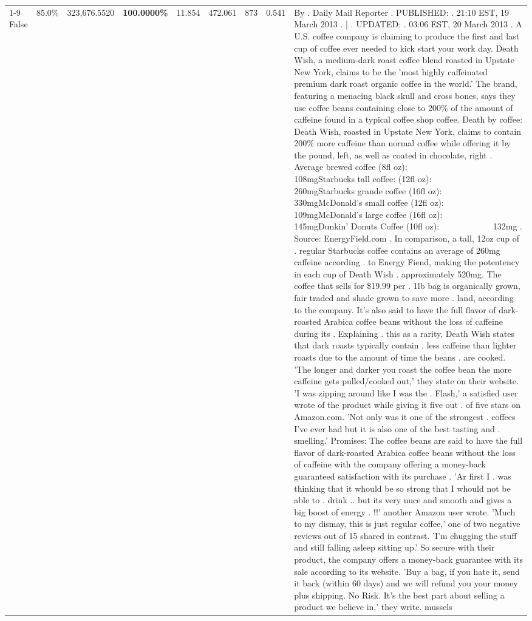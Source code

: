 \begin{table}[H]
{\begin{tabular}{lllrlllll}
\cline{1-9}
False & 85.0\% & 323,676.5520 & \bfseries \color{red} 100.0000\% & 11.854 & 472.061 & 873 & 0.541 & By . Daily Mail Reporter . PUBLISHED: . 21:10 EST, 19 March 2013 . | . UPDATED: . 03:06 EST, 20 March 2013 . A U.S. coffee company is claiming to produce the first and last cup of coffee ever needed to kick start your work day. Death Wish, a medium-dark roast coffee blend roasted in Upstate New York, claims to be the 'most highly caffeinated premium dark roast organic coffee in the world.' The brand, featuring a menacing black skull and cross bones, says they use coffee beans containing close to 200\% of the amount of caffeine found in a typical coffee shop coffee. Death by coffee: Death Wish, roasted in Upstate New York, claims to contain 200\% more caffeine than normal coffee while offering it by the pound, left, as well as coated in chocolate, right . Average brewed coffee (8fl oz):              108mgStarbucks tall coffee: (12fl oz):                260mgStarbucks grande coffee (16fl oz):         330mgMcDonald's small coffee (12fl oz):           109mgMcDonald's large coffee (16fl oz):           145mgDunkin' Donuts Coffee (10fl oz):             132mg . Source: EnergyField.com . In comparison, a tall, 12oz cup of . regular Starbucks coffee contains an average of 260mg caffeine according . to Energy Fiend, making the potentency in each cup of Death Wish . approximately 520mg. The coffee that sells for \$19.99 per . 1lb bag is organically grown, fair traded and shade grown to save more . land, according to the company. It's also said to have the full flavor of dark-roasted Arabica coffee beans without the loss of caffeine during its . Explaining . this as a rarity, Death Wish states that dark roasts typically contain . less caffeine than lighter roasts due to the amount of time the beans . are cooked. 'The longer and darker you roast the coffee bean the more caffeine gets pulled/cooked out,' they state on their website. 'I was zipping around like I was the . Flash,' a satisfied user wrote of the product while giving it five out . of five stars on Amazon.com. 'Not only was it one of the strongest . coffees I've ever had but it is also one of the best tasting and . smelling.’ Promises: The coffee beans are said to have the full flavor of dark-roasted Arabica coffee beans without the loss of caffeine with the company offering a money-back guaranteed satisfaction with its purchase . 'Ar first I . was thinking that it whould be so strong that I whould not be able to . drink .. but its very nuce and smooth and gives a big boost of energy . !!' another Amazon user wrote. 'Much to my dismay, this is just regular coffee,' one of two negative reviews out of 15 shared in contrast. 'I'm chugging the stuff and still falling asleep sitting up.' So secure with their product, the company offers a money-back guarantee with its sale according to its website. 'Buy a bag, if you hate it, send it back (within 60 days) and we will refund you your money plus shipping. No Risk. It’s the best part about selling a product we believe in,' they write. mussels \\

\end{tabular}}
\end{table}
